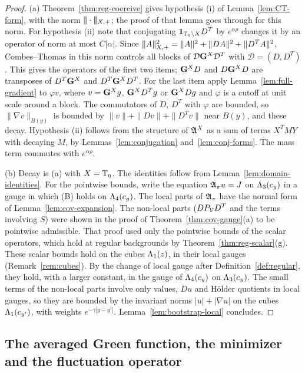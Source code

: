 \begin{proof}
(a) Theorem~\ref{thm:reg-coercive} gives hypothesis (i) of Lemma~\ref{lem:CT-form}, with the norm $|\!|\!|\cdot|\!|\!|_{X,+}$; the proof of that lemma goes through for this norm. For hypothesis (ii) note that conjugating $\mathbf 1_{\mathbb T_\eta\setminus X}D^T$ by $e^{\alpha\rho}$ changes it by an operator of norm at most $C|\alpha|$. Since $|\!|\!|A|\!|\!|_{X,+}^2=\|A\|^2+\|DA\|^2+\|D^TA\|^2$, Combes--Thomas in this norm controls all blocks of $\mathcal D\mathbf G^X\mathcal D^T$ with $\mathcal D=(D,D^T)$. This gives the operators of the first two items; $\mathbf G^XD$ and $D\mathbf G^XD$ are transposes of $D^T\mathbf G^X$ and $D^T\mathbf G^XD^T$. For the last item apply Lemma~\ref{lem:full-gradient} to $\varphi v$, where $v=\mathbf G^Xg$, $\mathbf G^XD^Tg$ or $\mathbf G^XDg$ and $\varphi$ is a cutoff at unit scale around a block. The commutators of $D$, $D^T$ with $\varphi$ are bounded, so $\|\nabla v\|_{B(y)}$ is bounded by $\|v\|+\|Dv\|+\|D^Tv\|$ near $B(y)$, and these decay. Hypothesis (ii) follows from the structure of $\mathfrak A^X$ as a sum of terms $X^TMY$ with decaying $M$, by Lemmas~\ref{lem:conjugation} and~\ref{lem:conj-forms}. The mass term commutes with $e^{\alpha\rho}$.

(b) Decay is (a) with $X=\mathbb T_\eta$. The identities follow from Lemma~\ref{lem:domain-identities}. For the pointwise bounds, write the equation $\mathfrak A_\pi u=J$ on $\Lambda_3(c_y)$ in a gauge in which (B) holds on $\Lambda_4(c_y)$. The local parts of $\mathfrak A_\pi$ have the normal form of Lemma~\ref{lem:cov-expansion}. The non-local parts ($DP_\mathcal V D^T$ and the terms involving $S$) were shown in the proof of Theorem~\ref{thm:cov-gauge}(a) to be pointwise admissible. That proof used only the pointwise bounds of the scalar operators, which hold at regular backgrounds by Theorem~\ref{thm:reg-scalar}(g). These scalar bounds hold on the cubes $\Lambda_1(z)$, in their local gauges (Remark~\ref{rem:cubes}). By the change of local gauge after Definition~\ref{def:regular}, they hold, with a larger constant, in the gauge of $\Lambda_4(c_y)$ on $\Lambda_3(c_y)$. The small terms of the non-local parts involve only values, $Du$ and H\"older quotients in local gauges, so they are bounded by the invariant norms $|u|+|\nabla u|$ on the cubes $\Lambda_1(c_{y'})$, with weights $e^{-\gamma|y-y'|}$. Lemma~\ref{lem:bootstrap-local} concludes.
\end{proof}

\subsection{The averaged Green function, the minimizer and the fluctuation operator}

